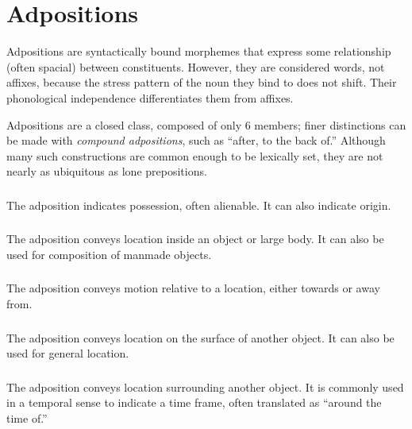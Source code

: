 \setchapterpreamble[u]{\margintoc}
\chapter{Adpositions}
Adpositions are syntactically bound morphemes that express some relationship (often spacial) between constituents. However, they are considered words, not affixes, because the stress pattern of the noun they bind to does not shift.  Their phonological independence differentiates them from affixes.

Adpositions are a closed class, composed of only 6 members; finer distinctions can be made with \emph{compound adpositions}, such as  “after, to the back of.” Although many such constructions are common enough to be lexically set, they are not nearly as ubiquitous as lone prepositions.

\subsection{}
The adposition  indicates possession, often alienable. It can also indicate origin. 

\subsection{}
The adposition  conveys location inside an object or large body. It can also be used for composition of manmade objects.

\subsection{}
The adposition  conveys motion relative to a location, either towards or away from.

\subsection{}
The adposition  conveys location on the surface of another object. It can also be used for general location.

\subsection{}
The adposition  conveys location surrounding another object. It is commonly used in a temporal sense to indicate a time frame, often translated as “around the time of.”


